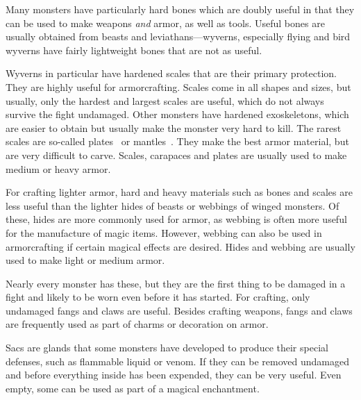 Many monsters have particularly hard bones which are doubly useful in that they can be used to make weapons \emph{and} armor, as well as tools. Useful bones are usually obtained from beasts and leviathans---wyverns, especially flying and bird wyverns have fairly lightweight bones that are not as useful.

Wyverns in particular have hardened scales that are their primary protection. They are highly useful for armorcrafting. Scales come in all shapes and sizes, but usually, only the hardest and largest scales are useful, which do not always survive the fight undamaged. Other monsters have hardened exoskeletons, which are easier to obtain but usually make the monster very hard to kill. The rarest scales are so-called plates~ or mantles~. They make the best armor material, but are very difficult to carve. Scales, carapaces and plates are usually used to make medium or heavy armor.

For crafting lighter armor, hard and heavy materials such as bones and scales are less useful than the lighter hides of beasts or webbings of winged monsters. Of these, hides are more commonly used for armor, as webbing is often more useful for the manufacture of magic items. However, webbing can also be used in armorcrafting if certain magical effects are desired. Hides and webbing are usually used to make light or medium armor.

Nearly every monster has these, but they are the first thing to be damaged in a fight and likely to be worn even before it has started. For crafting, only undamaged fangs and claws are useful. Besides crafting weapons, fangs and claws are frequently used as part of charms or decoration on armor.

Sacs are glands that some monsters have developed to produce their special defenses, such as flammable liquid or venom. If they can be removed undamaged and before everything inside has been expended, they can be very useful. Even empty, some can be used as part of a magical enchantment.

